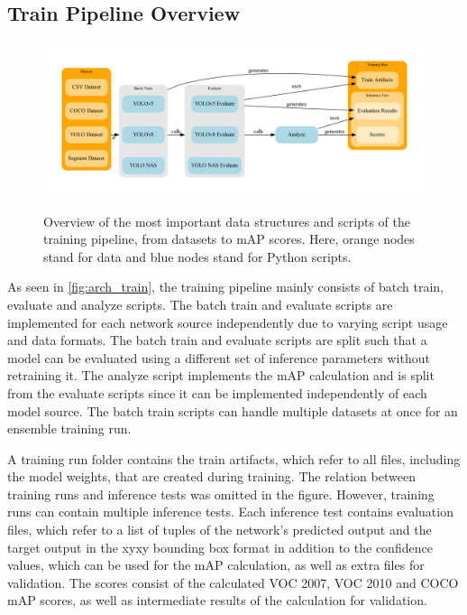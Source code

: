 \documentclass[10pt]{book}
\newcommand{\figureref}[1]{\autoref{#1}}
\begin{document}
\subsection{Train Pipeline Overview}

\begin{figure}
  \caption{Overview of the most important data structures and scripts of the training pipeline, from datasets to \ac{mAP} scores. Here, orange nodes stand for data and blue nodes stand for Python scripts.}
  \includegraphics[width=\textwidth]{graph/arch_train}
  \label{fig:arch_train}
\end{figure}

As seen in \figureref{fig:arch_train}, the training pipeline mainly consists of batch train, evaluate and analyze scripts. The batch train and evaluate scripts are implemented for each network source independently due to varying script usage and data formats. The batch train and evaluate scripts are split such that a model can be evaluated using a different set of inference parameters without retraining it. The analyze script implements the \ac{mAP} calculation and is split from the evaluate scripts since it can be implemented independently of each model source. The batch train scripts can handle multiple datasets at once for an ensemble training run.

A training run folder contains the train artifacts, which refer to all files, including the model weights, that are created during training. The relation between training runs and inference tests was omitted in the figure. However, training runs can contain multiple inference tests. Each inference test contains evaluation files, which refer to a list of tuples of the network's predicted output and the target output in the xyxy bounding box format in addition to the confidence values, which can be used for the \ac{mAP} calculation, as well as extra files for validation. The scores consist of the calculated VOC 2007, VOC 2010 and \ac{COCO} \ac{mAP} scores, as well as intermediate results of the calculation for validation.
\end{document}
